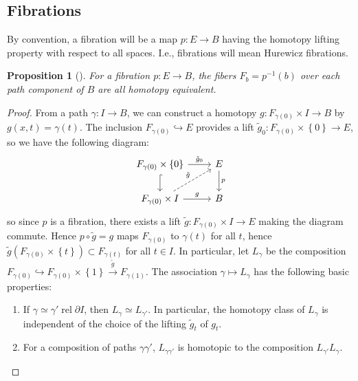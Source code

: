 \documentclass[reqno]{amsart}
\newtheorem{proposition}[theorem]{Proposition}
\theoremstyle{definition}
\theoremstyle{remark}
\DeclareMathOperator{\rel}{rel}
\begin{document}
     \subsection{Fibrations}

     By convention, a fibration will be a map
     $p \colon E \to B$ having the homotopy lifting
     property with respect to all spaces.
     I.e., fibrations will mean Hurewicz fibrations.

     \begin{proposition}[]
         For a fibration $p \colon E \to B$, the
         fibers $F_b = p^{-1}(b)$ over
         each path component of $B$ are all
         homotopy equivalent.
     \end{proposition}

     \begin{proof}
         From a path $\gamma \colon I \to B$, we can
         construct a homotopy
         $g \colon F_{\gamma(0)} \times I \to B$ by
         $g(x,t) = \gamma(t)$. The
         inclusion $F_{\gamma(0)} \hookrightarrow E$ 
         provides a lift
         $\tilde{g}_0 \colon F_{\gamma(0)} \times \left\{ 0 \right\} 
         \to E$, so we have the following diagram:
         \begin{equation*}
         \begin{tikzcd}
             F_{\gamma(0)} \times \left\{ 0 \right\} 
             \ar[r, "\tilde{g}_0"] \ar[d, hookrightarrow] &
             E \ar[d, "p"] \\
             F_{\gamma(0)} \times I \ar[r, "g"] 
             \ar[ru, dashed, "\tilde{g}"] & B
         \end{tikzcd}
         \end{equation*}
         so since $p$ is a fibration, there exists
         a lift
         $\tilde{g} \colon
         F_{\gamma(0)}\times I \to E$ making the diagram commute.
         Hence
         $p \circ \tilde{g} = g$ maps
         $F_{\gamma(0)}$ to $\gamma(t)$ for all
         $t$, hence
         $\tilde{g}
         \left( F_{\gamma(0)} \times \left\{ t \right\} 
         \right) \subset F_{\gamma(t)}$ for all
         $t \in I$.
         In particular,
         let $L_{\gamma}$ be the
         composition
         $F_{\gamma(0)}
         \hookrightarrow F_{\gamma(0)} \times 
         \left\{ 1 \right\} \stackrel{\tilde{g}}{\to} 
         F_{\gamma(1)}$.
         The association $\gamma \mapsto L_{\gamma}$ has the
         following basic properties:

         \begin{enumerate}
             \item If  $\gamma \simeq \gamma'
                 \rel \partial I$, then
                 $L_{\gamma} \simeq L_{\gamma'}$.
                 In particular, the homotopy class
                 of $L_{\gamma}$ is independent of the choice
                 of the lifting $\tilde{g}_{t}$ of $g_t$.
             \item For a composition of paths
                 $\gamma \gamma'$, $L_{\gamma \gamma'}$ 
                 is homotopic to the composition
                 $L_{\gamma'} L_{\gamma}$.
         \end{enumerate}


\end{proof}
\end{document}

